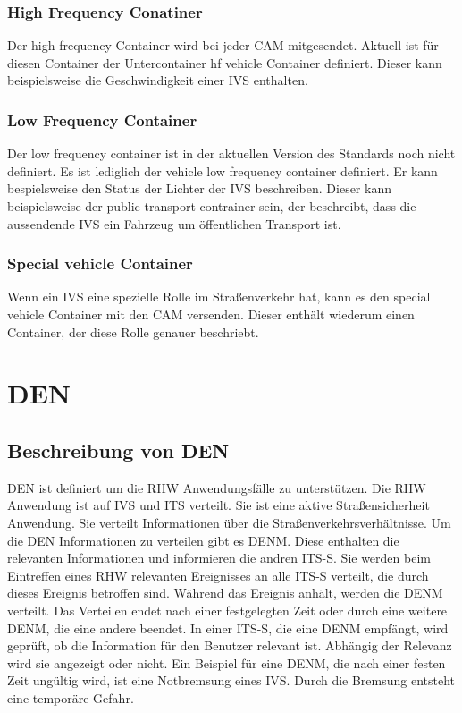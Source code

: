 \subsubsection{High Frequency Conatiner}
Der high frequency Container wird bei jeder \ac{CAM} mitgesendet. Aktuell ist für diesen Container der Untercontainer hf vehicle Container definiert. Dieser kann beispielsweise die Geschwindigkeit einer \ac{IVS} enthalten. 


\subsubsection{Low Frequency Container}
Der low frequency container ist in der aktuellen Version des Standards \cite{en302637-2} noch nicht definiert. Es ist lediglich der vehicle low frequency container definiert. Er kann bespielsweise den Status der Lichter der \ac{IVS} beschreiben. Dieser kann beispielsweise der public transport contrainer sein, der beschreibt, dass die aussendende \ac{IVS} ein Fahrzeug um öffentlichen Transport ist.

\subsubsection{Special vehicle Container}
Wenn ein \ac{IVS} eine spezielle Rolle im Straßenverkehr hat, kann es den special vehicle Container mit den \ac{CAM} versenden. Dieser enthält wiederum einen Container, der diese Rolle genauer beschriebt. 
\section{DEN\label{sec:den}}
\subsection{Beschreibung von DEN \label{facilityLayer_beschreibungDEN}}
\ac{DEN} ist definiert um die \ac{RHW} Anwendungsfälle zu unterstützen.	Die \ac{RHW} Anwendung ist auf \ac{IVS} und \ac{ITS} verteilt. Sie ist eine aktive Straßensicherheit Anwendung. Sie verteilt Informationen über die Straßenverkehrsverhältnisse. Um die \ac{DEN} Informationen zu verteilen gibt es \ac{DENM}. Diese enthalten die relevanten Informationen und informieren die andren \ac{ITS-S}. Sie werden beim Eintreffen eines \ac{RHW} relevanten Ereignisses an alle \ac{ITS-S} verteilt, die durch dieses Ereignis betroffen sind. Während das Ereignis anhält, werden die \ac{DENM} verteilt. Das Verteilen endet nach einer festgelegten Zeit oder durch eine weitere \ac{DENM}, die eine andere beendet. In einer \ac{ITS-S}, die eine \ac{DENM} empfängt, wird geprüft, ob die Information für den Benutzer relevant ist. Abhängig der Relevanz wird sie angezeigt oder nicht. Ein Beispiel für eine \ac{DENM}, die nach einer festen Zeit ungültig wird, ist eine Notbremsung eines \ac{IVS}. Durch die Bremsung entsteht eine temporäre Gefahr. 


